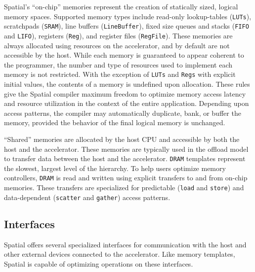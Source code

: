 Spatial's ``on-chip'' memories represent the creation of statically sized, logical memory spaces.
Supported memory types include read-only lookup-tables (\texttt{\small{LUTs}}), scratchpads (\texttt{\small{SRAM}}), line buffers (\texttt{\small{LineBuffer}}), fixed size queues and stacks (\texttt{\small{FIFO}} and \texttt{\small{LIFO}}),  registers (\texttt{\small{Reg}}), and register files (\texttt{\small{RegFile}}).
These memories are always allocated using resources on the accelerator, and by default are not accessible by the host.
While each memory is guaranteed to appear coherent to the programmer, the number and type of resources used to implement each memory is not restricted.
With the exception of \texttt{\small{LUTs}} and \texttt{\small{Regs}} with explicit initial values, the contents of a memory is undefined upon allocation.
These rules give the Spatial compiler maximum freedom to optimize memory access latency and resource utilization in the context of the entire application.
Depending upon access patterns, the compiler may automatically duplicate, bank, or buffer the memory, provided the behavior of the final logical memory is unchanged.

``Shared'' memories are allocated by the host CPU and accessible by both the host and the accelerator.
These memories are typically used in the offload model to transfer data between the host and the accelerator.
\texttt{\small{DRAM}} templates represent the slowest, largest level of the hierarchy. To help users optimize
memory controllers, \texttt{\small{DRAM}} is read and written using explicit transfers to and from on-chip memories.
These transfers are specialized for predictable (\texttt{\small{load}} and \texttt{\small{store}}) and data-dependent
(\texttt{\small{scatter}} and \texttt{\small{gather}}) access patterns.


\subsection{Interfaces}
Spatial offers several specialized interfaces for communication with the host and other external devices connected to the accelerator. Like memory templates, Spatial is capable of optimizing operations on these interfaces.

